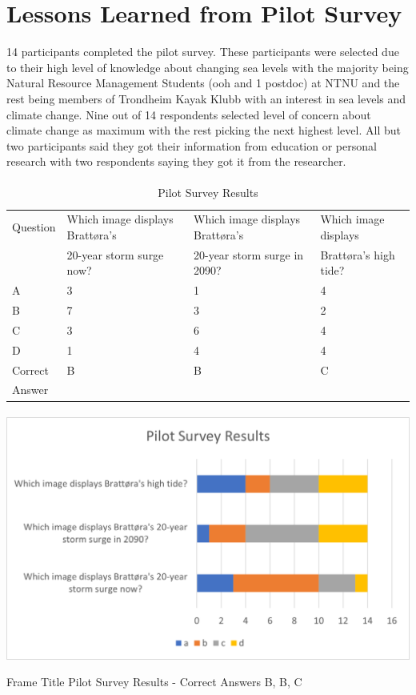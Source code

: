 \section{Lessons Learned from Pilot Survey}
14 participants completed the pilot survey. These participants were selected due to their high level of knowledge about changing sea levels with the majority being Natural Resource Management Students (ooh and 1 postdoc) at NTNU and the rest being members of Trondheim Kayak Klubb with an interest in sea levels and climate change. Nine out of 14 respondents selected level of concern about climate change as maximum with the rest picking the next highest level. All but two participants said they got their information from education or personal research with two respondents saying they got it from the researcher. 
\paragraph{}
\begin{table}[!ht]
    \centering
    \begin{tabular}{|l|l|l|l|}
    \hline
        Question & Which image displays Brattøra's  & Which image displays Brattøra's & Which image displays   \\ \newline
         & 20-year storm surge now? &  20-year storm surge in 2090? & Brattøra's high tide? \\ \hline
        A & 3 & 1 & 4 \\ \hline
        B & 7 & 3 & 2 \\ \hline
        C & 3 & 6 & 4 \\ \hline
        D & 1 & 4 & 4 \\ \hline
        Correct & B & B & C \\ \newline
        Answer &  &  &  \\ \hline
    \end{tabular}
    \caption{Pilot Survey Results}
    \label{table: pilot-survey}
\end{table}
\paragraph{}
\includegraphics[width=1\textwidth]{fig_results/pilot-survey-results.png}
\begin{frame}{Frame Title}
    Pilot Survey Results - Correct Answers B, B, C
\end{frame}
